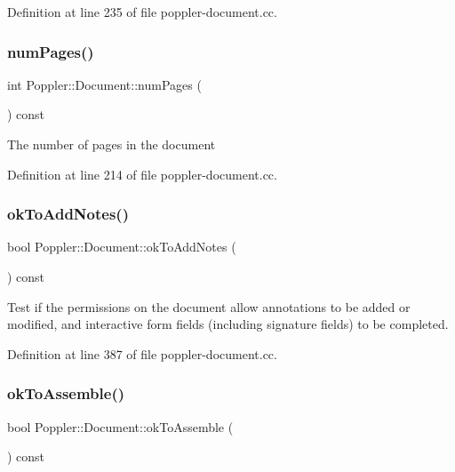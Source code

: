 Definition at line 235 of file poppler-\/document.\+cc.

\mbox{\label{class_poppler_1_1_document_a260f9b7105860a757aa1b018cd4f6ccb}} 
\subsubsection{\texorpdfstring{num\+Pages()}{numPages()}}
{\footnotesize\ttfamily int Poppler\+::\+Document\+::num\+Pages (\begin{DoxyParamCaption}{ }\end{DoxyParamCaption}) const}

The number of pages in the document 

Definition at line 214 of file poppler-\/document.\+cc.

\mbox{\label{class_poppler_1_1_document_a33fa45a3666edcdc9b5deb34861a6670}} 
\subsubsection{\texorpdfstring{ok\+To\+Add\+Notes()}{okToAddNotes()}}
{\footnotesize\ttfamily bool Poppler\+::\+Document\+::ok\+To\+Add\+Notes (\begin{DoxyParamCaption}{ }\end{DoxyParamCaption}) const}

Test if the permissions on the document allow annotations to be added or modified, and interactive form fields (including signature fields) to be completed. 

Definition at line 387 of file poppler-\/document.\+cc.

\mbox{\label{class_poppler_1_1_document_aabaf987b173987c4ed587ecc70a21edd}} 
\subsubsection{\texorpdfstring{ok\+To\+Assemble()}{okToAssemble()}}
{\footnotesize\ttfamily bool Poppler\+::\+Document\+::ok\+To\+Assemble (\begin{DoxyParamCaption}{ }\end{DoxyParamCaption}) const}

